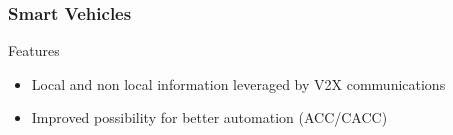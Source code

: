\begin{frame}
\frametitle{Smart Vehicles}
    \begin{center}
        \resizebox{0.9\linewidth}{!}{%
            
        }
        \begin{exampleblock}{Features}
            \begin{itemize}
                \item Local and non local information leveraged by V2X communications
                \item Improved possibility for better automation (ACC/CACC)
            \end{itemize}
        \end{exampleblock}
    \end{center}
\end{frame}
